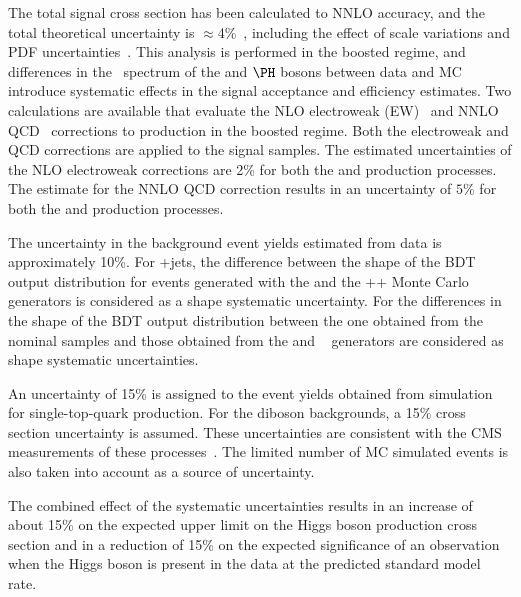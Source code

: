 \documentclass[12pt,twoside,a4paper,cmspaper,final,collab]{cms-tdr}
\begin{document}
The total \VH signal cross section has
been calculated to NNLO accuracy,
and the total theoretical uncertainty is $\approx$4\%~\cite{Dittmaier:2012vm}, including
the effect of scale variations and PDF uncertainties~\cite{Alekhin:2011sk,Botje:2011sn,Lai:2010vv,Martin:2009iq,Ball:2011mu}. This analysis is performed
       in the boosted regime, and differences in
       the \pt\ spectrum of the \Vvar and $\PH$ bosons between data and
       MC introduce systematic effects in the
       signal acceptance and efficiency estimates.  Two
       calculations are available that evaluate the NLO
       electroweak (EW)~\cite{HAWK1,HAWK2,HAWK3} and NNLO QCD~\cite{Ferrera:2011bk}
       corrections to \VH production in the boosted regime. Both the electroweak and
       QCD corrections are applied to the signal samples. The estimated uncertainties of the NLO electroweak corrections
       are 2\% for both the \ZH and \WH production processes.
       The estimate for the NNLO QCD correction results in an uncertainty of $5\%$ for both the \ZH and \WH production
       processes.


The uncertainty in the background event yields
estimated from data is approximately 10\%. For {\Vvar}+jets, the
difference between the shape of the BDT output distribution for events generated
with the {\MADGRAPH} and the {\HERWIG++} Monte Carlo generators is
considered as a shape systematic uncertainty.
For \ttbar the differences in the shape of the BDT output distribution
between the one obtained from the nominal {\MADGRAPH}
samples and those obtained from the {\POWHEG} and {\MCATNLO}~\cite{Frixione:2002ik} generators are  considered as shape
systematic uncertainties.


An uncertainty of 15\% is assigned to the event yields obtained
from simulation for single-top-quark
production. For the diboson backgrounds, a 15\% cross section
uncertainty is assumed.
These uncertainties are consistent with the CMS measurements
of these processes~\cite{Chatrchyan:2012ep,Chatrchyan:2013oev}.
The limited number of MC simulated events
is also taken into account as a source of uncertainty.

The combined effect of the systematic uncertainties results in an
increase of about 15\% on the expected upper limit on the Higgs boson production
cross section and in a reduction of 15\%  on
the expected significance of an observation when the Higgs boson is
present in the data at the predicted standard model rate.
\end{document}
